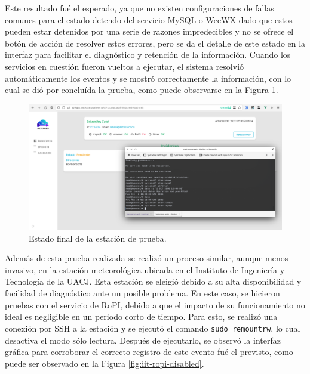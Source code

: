 Este resultado fué el esperado, ya que no existen configuraciones de fallas comunes para el estado detendo del servicio MySQL o WeeWX dado que estos pueden estar detenidos por una serie de razones impredecibles y no se ofrece el botón de acción de resolver estos errores, pero se da el detalle de este estado en la interfaz para facilitar el diagnóstico y retención de la información. Cuando los servicios en cuestión fueron vueltos a ejecutar, el sistema resolvió automáticamente los eventos y se mostró correctamente la información, con lo cual se dió por concluída la prueba, como puede observarse en la Figura \ref{fig:test-station-fixed}.

\begin{figure}[!ht]
	\centering
	\includegraphics[width=1\linewidth]{images/screenshots/0.1.5-test_station_fixed.png}
	\caption{Estado final de la estación de prueba.}
	\label{fig:test-station-fixed}
\end{figure}

Además de esta prueba realizada se realizó un proceso similar, aunque menos invasivo, en la estación meteorológica ubicada en el Instituto de Ingeniería y Tecnología de la UACJ. Esta estación se eleigió debido a su alta disponibilidad y facilidad de diagnóstico ante un posible problema. En este caso, se hicieron pruebas con el servicio de RoPI, debido a que el impacto de su funcionamiento no ideal es negligible en un periodo corto de tiempo. Para esto, se realizó una conexión por SSH a la estación y se ejecutó el comando \texttt{sudo remountrw}, lo cual desactiva el modo sólo lectura. Después de ejecutarlo, se observó la interfaz gráfica para corroborar el correcto registro de este evento fué el previsto, como puede ser observado en la Figura \ref{fig:iit-ropi-disabled}.

